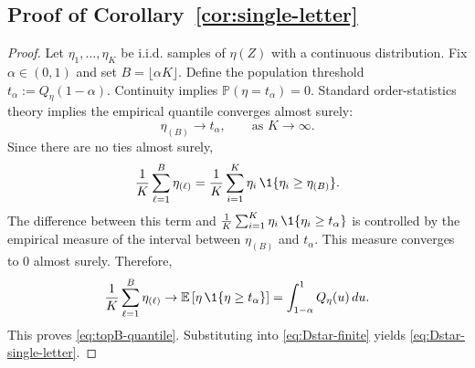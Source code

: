 \documentclass[twocolumn]{scholar7}
\newcommand{\E}{\mathbb{E}}
\newcommand{\Prob}{\mathbb{P}}
\newcommand{\bracks}[1]{\left[#1\right]}
\begin{document}
\begin{appendix}
\subsection{Proof of Corollary~\ref{cor:single-letter}}
\label{app:proof-single-letter}
\begin{proof}
Let $\eta_1,\dots,\eta_K$ be i.i.d. samples of $\eta(Z)$ with a continuous distribution.
Fix $\alpha\in(0,1)$ and set $B=\lfloor \alpha K\rfloor$.
Define the population threshold $t_\alpha := Q_\eta(1-\alpha)$.
Continuity implies $\Prob(\eta=t_\alpha)=0$.
Standard order-statistics theory implies the empirical quantile converges almost surely:
\[
\eta_{(B)}\to t_\alpha,\qquad\text{as }K\to\infty.
\]
Since there are no ties almost surely,
\[
\frac{1}{K}\sum_{\ell=1}^{B} \eta_{(\ell)}
=
\frac{1}{K}\sum_{i=1}^{K} \eta_i\,\1\{\eta_i\ge \eta_{(B)}\}.
\]
The difference between this term and $\frac{1}{K}\sum_{i=1}^K \eta_i\,\1\{\eta_i\ge t_\alpha\}$ is controlled by the empirical measure of the interval between $\eta_{(B)}$ and $t_\alpha$.
This measure converges to $0$ almost surely.
Therefore,
\[
\frac{1}{K}\sum_{\ell=1}^{B} \eta_{(\ell)}
\to
\E\bracks{\eta\,\1\{\eta\ge t_\alpha\}}
=
\int_{1-\alpha}^{1} Q_\eta(u)\,du.
\]
This proves \eqref{eq:topB-quantile}.
Substituting into \eqref{eq:Dstar-finite} yields \eqref{eq:Dstar-single-letter}.
\end{proof}

\end{appendix}



\end{document}
